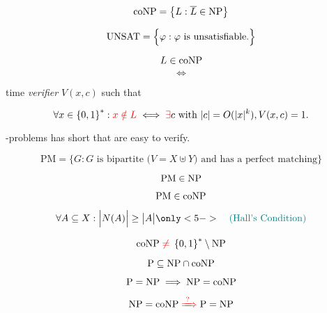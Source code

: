 
\begin{frame}
  \[
	\text{coNP} = \left\{ L: \overline{L} \in \text{NP} \right\}
  \]

  \pause
  \[
	\text{UNSAT} = \Big\{ \varphi: \varphi \text{ is unsatisfiable.} \Big\}
  \]

  \pause
  \begin{definition}[\conp]
	\[
	  L \in \text{coNP}
	\]
	\[
	  \iff
	\]
	\begin{center}
	  \red{$\exists$}  time \emph{verifier} $V(x,c)$ such that
	\end{center}
	\pause 
	\[
	  \forall x \in \left\{ 0,1 \right\}^{\ast}: \textcolor{red}{x \notin L} \iff \textcolor{red}{\exists} c \text{ with } |c| = O(|x|^{k}), V(x,c) = 1.
	\]
  \end{definition}

  \pause
  \begin{center}
	{\large \conp-problems has short  that are easy to verify.}
  \end{center}
\end{frame}

\begin{frame}
  \[
	\text{PM} = \Big\{ G: G \text{ is bipartite ($V = X \uplus Y$) and has a perfect matching} \Big\}
  \]

  \pause
  \[
	\text{PM} \in \text{NP}
  \]

  \pause
  \[
	\text{PM} \in \text{coNP}
  \]

  \pause
  \[
	\forall A \subseteq X: \Big\lvert N(A) \Big\rvert \ge \big\lvert A \big\rvert \only<5->{\quad \text{\teal{(Hall's Condition)}}}
  \]
\end{frame}

\begin{frame}
  \[
	\text{coNP}{} \;\textcolor{red}{\neq}\; \left\{ 0,1 \right\}^{\ast} \setminus \text{NP}
  \]

  \pause
  \[
	\text{P} \subseteq \text{NP} \cap \text{coNP}
  \]

  \pause
  \[
	\text{P} = \text{NP} \implies \text{NP} = \text{coNP}
  \]

  \pause

  \pause
  \[
	\text{NP} = \text{coNP} \;\textcolor{red}{\xRightarrow{\;?\;}}\; \text{P} = \text{NP}
  \]
\end{frame}
